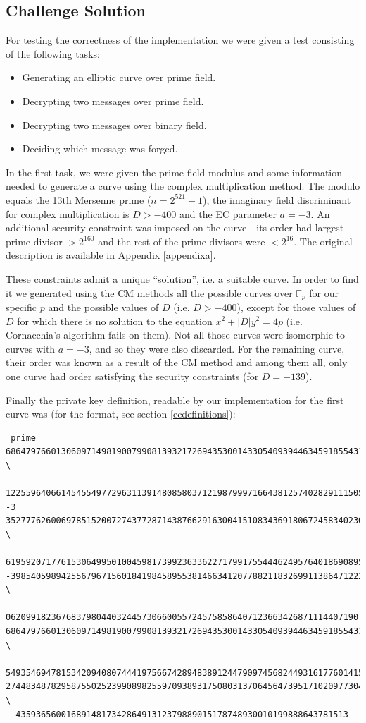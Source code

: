 \documentclass[11pt,english]{article}
\begin{document}
\subsection{Challenge Solution}
For testing the correctness of the implementation we were given a test consisting of the following tasks:

\begin{itemize}
 \item Generating an elliptic curve over prime field.
 \item Decrypting two messages over prime field.
 \item Decrypting two messages over binary field.
 \item Deciding which message was forged.
\end{itemize}

In the first task, we were given the prime field modulus and some information needed to generate a curve using the complex multiplication method. The modulo equals the 13th Mersenne prime ($n=2^{521}-1$), the imaginary field discriminant for complex multiplication is $D>-400$ and the EC parameter $a=-3$. 
An additional security constraint was imposed on the curve - its order had largest prime divisor $>2^{160}$ and the rest of the prime divisors were $<2^{16}$. 
The original description is available in Appendix \ref{appendixa}.

These constraints admit a unique ``solution'', i.e. a suitable curve. In order to find it we generated using the CM methods all the possible
curves over $\mathbb{F}_p$ for our specific $p$ and the possible values of $D$ (i.e. $D>-400$), except for those values of
$D$ for which there is no solution to the equation $x^2+|D|y^2=4p$ (i.e. Cornacchia's algorithm fails on them). Not all those curves
were isomorphic to curves with $a=-3$, and so they were also discarded. For the remaining curve, their order was known as a result
of the CM method and among them all, only one curve had order satisfying the security constraints (for $D=-139$).

Finally the private key definition, readable by our implementation for the first curve was (for the format, see section \ref{ecdefinitions}):

\begin{verbatim}
 prime
6864797660130609714981900799081393217269435300143305409394463459185543183397656052 \
  122559640661454554977296311391480858037121987999716643812574028291115057151
-3
3527776260069785152007274377287143876629163004151083436918067245834023095352803352 \
  619592071776153064995010045981739923633622717991755444624957640186908953364
-398540598942556796715601841984589553814663412077882118326991138647122232976515044 \
  0620991823676837980440324457306600557245758586407123663426871114407190797434
6864797660130609714981900799081393217269435300143305409394463459185543183397650992 \
  549354694781534209408074441975667428948389124479097456824493161776014158579
2744834878295875502523990898255970938931750803137064564739517102097730423490652151 \
  435936560016891481734286491312379889015178748930010199888643781513
\end{verbatim}
\end{document}
